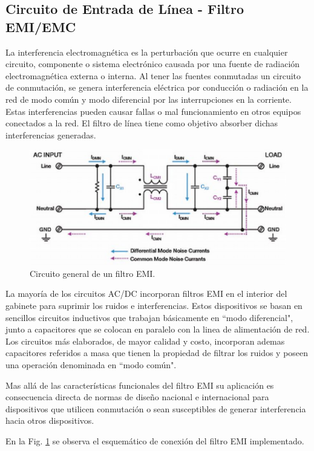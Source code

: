 \documentclass[11pt, a4paper]{article}
\begin{document}
\subsection{Circuito de Entrada de Línea - Filtro EMI/EMC}
La interferencia electromagnética es la perturbación que ocurre en cualquier circuito, componente o sistema electrónico causada por una fuente de radiación electromagnética externa o interna.
Al tener las fuentes conmutadas un circuito de conmutación, se genera interferencia eléctrica por conducción o radiación en la red de modo común y modo diferencial por las interrupciones en la corriente. Estas interferencias pueden causar fallas o mal funcionamiento en otros equipos conectados a la red. El filtro de línea tiene como objetivo absorber dichas interferencias generadas.

\begin{figure}[H]
	\centering
	\includegraphics[scale = 0.4]{Imagenes/emi2}
	\caption{Circuito general de un filtro EMI.}
	\label{emi}
\end{figure}

	La mayoría de los circuitos AC/DC incorporan filtros EMI en el interior del gabinete para suprimir los ruidos e interferencias. Estos dispositivos se basan en sencillos circuitos inductivos que trabajan básicamente en ``modo diferencial", junto a capacitores que se colocan en paralelo con la linea de alimentación de red. Los circuitos más elaborados, de mayor calidad y costo, incorporan ademas capacitores referidos a masa que tienen la propiedad de filtrar los ruidos y poseen una operación denominada en ``modo común". 

Mas allá de las características funcionales del filtro EMI su aplicación es consecuencia directa de normas de diseño nacional e internacional para dispositivos que utilicen conmutación o sean susceptibles de generar interferencia hacia otros dispositivos.

En la Fig. \ref{emi} se observa el esquemático de conexión del filtro EMI implementado.
\end{document}
